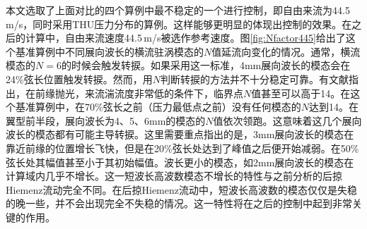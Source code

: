 本文选取了上面对比的四个算例中最不稳定的一个进行控制，即自由来流为44.5\,m/s，同时采用THU压力分布的算例。这样能够更明显的体现出控制的效果。在之后的计算中，自由来流速度44.5\,m/s被选作参考速度。图\ref{fig:Nfactor445}给出了这个基准算例中不同展向波长的横流驻涡模态的$N$值延流向变化的情况。通常，横流模态的$N=6$的时候会触发转捩。如果采用这一标准，4mm展向波长的模态会在24\%弦长位置触发转捩。然而，用$N$判断转捩的方法并不十分稳定可靠。有文献指出\cite{saric2011}，在前缘抛光，来流湍流度非常低的条件下，临界点$N$值甚至可以高于14。在这个基准算例中，在70\%弦长之前（压力最低点之前）没有任何模态的$N$达到14。在翼型前半段，展向波长为4、5、6mm的模态的$N$值依次领跑。这意味着这几个展向波长的模态都有可能主导转捩。这里需要重点指出的是，3mm展向波长的模态在靠近前缘的位置增长飞快，但是在20\%弦长处达到了峰值之后便开始减弱。在50\%弦长处其幅值甚至小于其初始幅值。波长更小的模态，如2mm展向波长的模态在计算域内几乎不增长。这一短波长高波数模态不增长的特性与之前分析的后掠Hiemenz流动完全不同。在后掠Hiemenz流动中，短波长高波数的模态仅仅是失稳的晚一些，并不会出现完全不失稳的情况。这一特性将在之后的控制中起到非常关键的作用。

